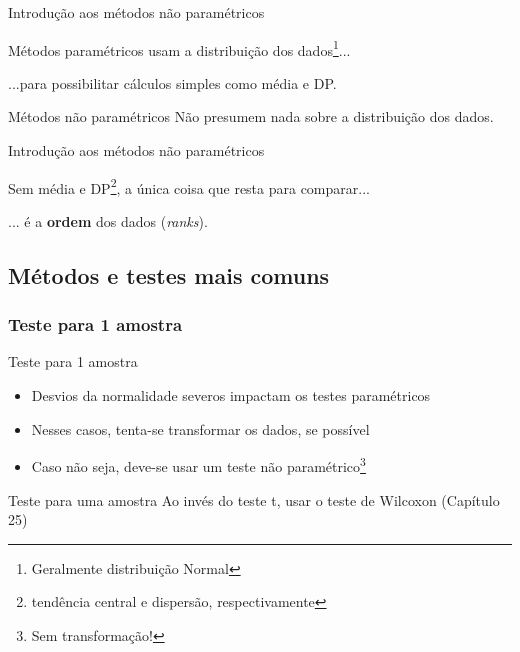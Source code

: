\documentclass{beamer}
\begin{document}
\begin{frame}{Introdução aos métodos não paramétricos}
  \begin{block}{Métodos paramétricos}
    \footnotesize
    usam a distribuição dos dados\footnote{\tiny Geralmente distribuição Normal}...

    \bigskip
    ...para possibilitar cálculos simples como média e DP.
  \end{block}
  \bigskip
  \bigskip
  \bigskip
  \begin{block}{Métodos não paramétricos}
    Não presumem nada sobre a distribuição dos dados.
  \end{block}
\end{frame}

\begin{frame}{Introdução aos métodos não paramétricos}
  \begin{center}
    Sem média e DP\footnote{tendência central e dispersão, respectivamente}, a única coisa que resta para comparar...

    \bigskip
    ... é a {\bf ordem} dos dados ({\em ranks}).
  \end{center}
\end{frame}

\subsection[Testes]{Métodos e testes mais comuns}

\subsubsection[1 amostra]{Teste para 1 amostra}

\begin{frame}{Teste para 1 amostra}
  \begin{itemize}
    \small
  \item Desvios da normalidade severos impactam os testes paramétricos
    \bigskip
  \item Nesses casos, tenta-se transformar os dados, se possível
  \item Caso não seja, deve-se usar um teste não paramétrico\footnote{Sem transformação!}
  \end{itemize}
  \bigskip
  \begin{block}{Teste para uma amostra}
    Ao invés do teste t, usar o teste de Wilcoxon {\footnotesize (Capítulo 25)}
  \end{block}
\end{frame}
\end{document}

